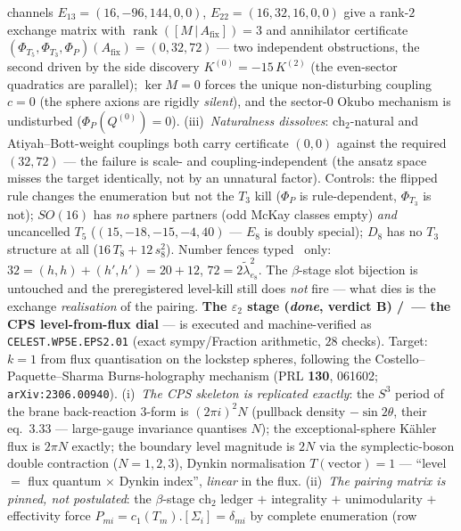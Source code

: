 \documentclass[11pt,a4paper]{article}
\begin{document}
\begin{itemize}
\begin{itemize}
channels $E_{13}=(16,-96,144,0,0)$, $E_{22}=(16,32,16,0,0)$ give a rank-$2$ exchange matrix with
$\operatorname{rank}([M\,|\,A_{\mathrm{fix}}])=3$ and annihilator certificate
$(\Phi_{T_5},\Phi_{T_3},\Phi_P)(A_{\mathrm{fix}})=(0,32,72)$ --- two independent obstructions, the
second driven by the side discovery $K^{(0)}=-15\,K^{(2)}$ (the even-sector quadratics are
parallel); $\ker M=0$ forces the unique non-disturbing coupling $c=0$ (the sphere axions are
rigidly \emph{silent}), and the sector-$0$ Okubo mechanism is undisturbed
($\Phi_P(Q^{(0)})=0$). (iii)~\emph{Naturalness dissolves}: $\mathrm{ch}_2$-natural and
Atiyah--Bott-weight couplings both carry certificate $(0,0)$ against the required $(32,72)$ ---
the failure is scale- and coupling-independent (the ansatz space misses the target identically,
not by an unnatural factor). Controls: the flipped rule changes the enumeration but not the
$T_3$ kill ($\Phi_P$ is rule-dependent, $\Phi_{T_3}$ is not); $SO(16)$ has \emph{no} sphere
partners (odd McKay classes empty) \emph{and} uncancelled $T_5$ ($(15,-18,-15,-4,40)$ --- $E_8$
is doubly special); $D_8$ has no $T_3$ structure at all ($16\,T_8{+}12\,s_8^2$). Number fences
typed \mC\ only: $32=(h,h){+}(h',h')=20{+}12$, $72=2\tilde\lambda^2_{e_8}$. The $\beta$-stage
slot bijection is untouched and the preregistered level-kill still does \emph{not} fire --- what
dies is the exchange \emph{realisation} of the pairing.
\textbf{The $\varepsilon_2$ stage (\emph{done}, verdict B) \mE/\mC\ --- the CPS level-from-flux
dial} --- is executed and machine-verified as \texttt{CELEST.WP5E.EPS2.01}
 (exact sympy/Fraction arithmetic, $28$
checks). Target: $k=1$ from flux quantisation on the lockstep spheres, following the
Costello--Paquette--Sharma Burns-holography mechanism (PRL \textbf{130}, 061602;
\texttt{arXiv:2306.00940}). (i)~\emph{The CPS skeleton is replicated exactly}: the $S^3$ period
of the brane back-reaction $3$-form is $(2\pi i)^2N$ (pullback density $-\sin2\theta$, their
eq.~3.33 --- large-gauge invariance quantises $N$); the exceptional-sphere K\"ahler flux is
$2\pi N$ exactly; the boundary level magnitude is $2N$ via the symplectic-boson double
contraction ($N=1,2,3$), Dynkin normalisation $T(\text{vector})=1$ --- ``level $=$ flux quantum
$\times$ Dynkin index'', \emph{linear} in the flux. (ii)~\emph{The pairing matrix is pinned, not
postulated}: the $\beta$-stage $\mathrm{ch}_2$ ledger $+$ integrality $+$ unimodularity $+$
effectivity force $P_{mi}=c_1(T_m).[\Sigma_i]=\delta_{mi}$ by complete enumeration (row

\end{itemize}
\end{itemize}
\end{document}
